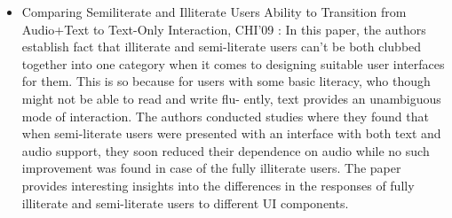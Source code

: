 \begin{itemize}
\item Comparing Semiliterate and Illiterate Users Ability to Transition from Audio+Text
to Text-Only Interaction, CHI’09 \cite{findlater2009comparing} : In this paper, the authors establish fact that
illiterate and semi-literate users can’t be both clubbed together into one category
when it comes to designing suitable user interfaces for them. This is so because for
users with some basic literacy, who though might not be able to read and write flu-
ently, text provides an unambiguous mode of interaction. The authors conducted
studies where they found that when semi-literate users were presented with an
interface with both text and audio support, they soon reduced their dependence
on audio while no such improvement was found in case of the fully illiterate users.
The paper provides interesting insights into the differences in the responses of fully
illiterate and semi-literate users to different UI components.
\end{itemize}


